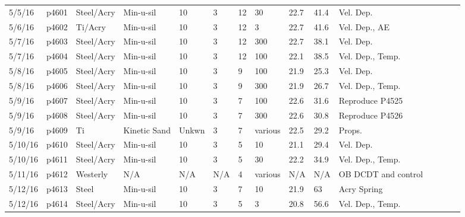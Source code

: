 \begin{landscape}
\begin{longtable} {lllllllllllllll}
5/5/16   & p4601      & Steel/Acry    & Min-u-sil    & 10           & 3         & 12            & 30                           & 22.7        & 41.4     & Vel. Dep.\\
5/6/16   & p4602      & Ti/Acry & Min-u-sil    & 10           & 3         & 12            & 3                            & 22.7        & 41.6     & Vel. Dep., AE\\
5/7/16   & p4603      & Steel/Acry    & Min-u-sil    & 10           & 3         & 12            & 300                          & 22.7        & 38.1     & Vel. Dep.\\
5/7/16   & p4604      & Steel/Acry    & Min-u-sil    & 10           & 3         & 12            & 100                          & 22.1        & 38.5     & Vel. Dep., Temp.\\
5/8/16   & p4605      & Steel/Acry    & Min-u-sil    & 10           & 3         & 9             & 100                          & 21.9        & 25.3     & Vel. Dep.\\
5/8/16   & p4606      & Steel/Acry    & Min-u-sil    & 10           & 3         & 9             & 300                          & 21.9        & 26.7     & Vel. Dep., Temp.\\
5/9/16   & p4607      & Steel/Acry    & Min-u-sil    & 10           & 3         & 7             & 100                          & 22.6        & 31.6     & Reproduce P4525\\
5/9/16   & p4608      & Steel/Acry    & Min-u-sil    & 10           & 3         & 7             & 300                          & 22.6        & 30.8     & Reproduce P4526\\
5/9/16   & p4609      & Ti         & Kinetic Sand & Unkwn            & 3         & 7             & various                      & 22.5        & 29.2     & Props.\\
5/10/16  & p4610      & Steel/Acry    & Min-u-sil    & 10           & 3         & 5             & 10                           & 21.1        & 29.4     & Vel. Dep.\\
5/10/16  & p4611      & Steel/Acry    & Min-u-sil    & 10           & 3         & 5             & 30                           & 22.2        & 34.9     & Vel. Dep., Temp.\\
5/11/16  & p4612      & Westerly         & N/A          & N/A          & N/A       & 4             & various                      & N/A         & N/A      & OB DCDT and control\\
5/12/16  & p4613      & Steel            & Min-u-sil    & 10           & 3         & 7             & 10                           & 21.9        & 63       & Acry Spring\\
5/12/16  & p4614      & Steel/Acry    & Min-u-sil    & 10           & 3         & 5             & 3                            & 20.8        & 56.6     & Vel. Dep., Temp.\\
\end{longtable}
\end{landscape}